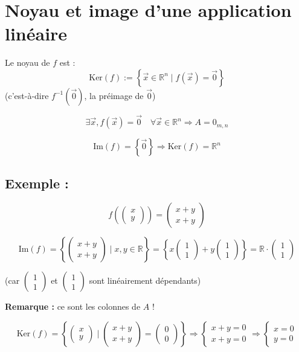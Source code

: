 \documentclass{article}
\begin{document}
\section*{Noyau et image d'une application linéaire}

Le noyau de $f$ est :
\[
\text{Ker}(f) := \left\{ \vec{x} \in \mathbb{R}^n \mid f(\vec{x}) = \vec{0} \right\}
\]
(c'est-à-dire $f^{-1}(\vec{0})$, la préimage de $\vec{0}$)

\[
\exists \vec{x}, f(\vec{x}) = \vec{0} \quad \forall \vec{x} \in \mathbb{R}^n \Rightarrow A = 0_{m,n}
\]

\[
\text{Im}(f) = \left\{ \vec{0} \right\} \Rightarrow \text{Ker}(f) = \mathbb{R}^n
\]

\subsection*{Exemple :}

\[
f\left( \begin{pmatrix} x \\ y \end{pmatrix} \right) = \begin{pmatrix} x + y \\ x + y \end{pmatrix}
\]

\[
\text{Im}(f) = \left\{ \begin{pmatrix} x + y \\ x + y \end{pmatrix} \mid x, y \in \mathbb{R} \right\}
= \left\{ x \begin{pmatrix} 1 \\ 1 \end{pmatrix} + y \begin{pmatrix} 1 \\ 1 \end{pmatrix} \right\}
= \mathbb{R} \cdot \begin{pmatrix} 1 \\ 1 \end{pmatrix}
\]

(car $\begin{pmatrix} 1 \\ 1 \end{pmatrix}$ et $\begin{pmatrix} 1 \\ 1 \end{pmatrix}$ sont linéairement dépendants)

\textbf{Remarque :} ce sont les colonnes de $A$ !

\[
\text{Ker}(f) = \left\{ \begin{pmatrix} x \\ y \end{pmatrix} \mid \begin{pmatrix} x + y \\ x + y \end{pmatrix} = \begin{pmatrix} 0 \\ 0 \end{pmatrix} \right\}
\Rightarrow
\begin{cases}
x + y = 0 \\
x + y = 0
\end{cases}
\Rightarrow
\begin{cases}
x = 0 \\
y = 0
\end{cases}
\]
\end{document}
